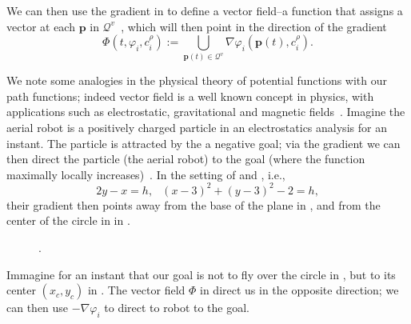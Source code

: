 We can then use the gradient in  to define a vector field--a function that assigns a vector at each $\mathbf{p}$ in $\mathcal{Q}^v$~\citep{lavalle2006planning}, which will then point in the direction of the gradient
\begin{equation}\label{eq:vec-field-def}
  \varPhi(t,\varphi_i,c_i^\rho):=\bigcup\limits_{\mathbf{p}(t)\in\mathcal{Q}^v}{\nabla\varphi_i(\mathbf{p}(t),c_i^\rho)}.
\end{equation}

We note some analogies in the physical theory of potential functions with our path functions; indeed vector field is a well known concept in physics, with applications such as electrostatic, gravitational and magnetic fields~\citep{feynman2015feynman}. Imagine the aerial robot is a positively charged particle in an electrostatics analysis for an instant. The particle is attracted by the a negative goal; via the gradient we can then direct the particle (the aerial robot) to the goal (where the function maximally locally increases)~\citep{choset2005principles}. In the setting of  and , i.e., 
\begin{equation}\label{eq:two-paths}
  2y-x=h,\,\,\,\ (x-3)^2+(y-3)^2-2=h,
\end{equation}
their gradient then points away from the base of the plane in , and from the center of the circle in  in . 
\begin{figure}[h!]
  \centering
  \selectfont
  
  \caption[.]{.}
  \label{fig:grad}
\end{figure}
Immagine for an instant that our goal is not to fly over the circle in , but to its center $(x_c,y_c)$ in . The vector field $\varPhi$ in  direct us in the opposite direction; we can then use $-\nabla\varphi_i$ to direct to robot to the goal.

